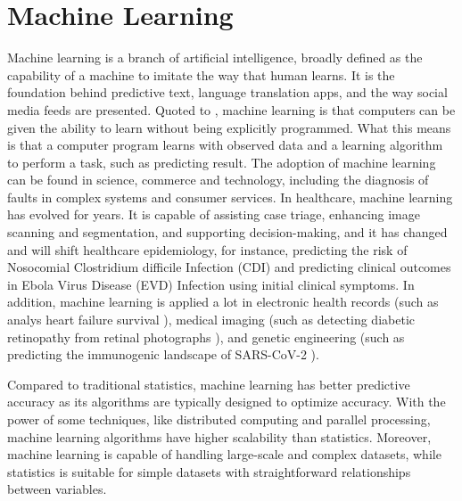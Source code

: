 \documentclass[12pt,a4paper,english
]{tunithesis}
\begin{document}
\section{Machine Learning}
Machine learning is a branch of artificial intelligence, broadly defined as the capability of a machine to imitate the way that human learns. It is the foundation behind predictive text, language translation apps, and the way social media feeds are presented. \parencite{sara2021} Quoted to \textcite{samuel1959}, machine learning is that computers can be given the ability to learn without being explicitly programmed. What this means is that a computer program learns with observed data and a learning algorithm to perform a task, such as predicting result. %
The adoption of machine learning can be found in science, commerce and technology, including the diagnosis of faults in complex systems and consumer services. \parencite{jorden2015} In healthcare, machine learning has evolved for years. It is capable of assisting case triage, enhancing image scanning and segmentation, and supporting decision-making, and it has changed and will shift healthcare epidemiology, for instance, predicting the risk of Nosocomial Clostridium difficile Infection (CDI) and predicting clinical outcomes in Ebola Virus Disease (EVD) Infection using initial clinical symptoms. \parencite{Jenna2017, Habehh2021} In addition, machine learning is applied a lot in electronic health records (such as analys heart failure survival \parencite{Panahiazar2015}), medical imaging (such as detecting diabetic retinopathy from retinal photographs \parencite{Gulshan2016}), and genetic engineering (such as predicting the immunogenic landscape of SARS-CoV-2 \parencite{Malone2020} ).

Compared to traditional statistics, machine learning has better predictive accuracy as its algorithms are typically designed to optimize accuracy. With the power of some techniques, like distributed computing and parallel processing, machine learning algorithms have higher scalability than statistics. Moreover, machine learning is capable of handling large-scale and complex datasets, while statistics is suitable for simple datasets with straightforward relationships between variables.  \parencite{Bzdok2018, Rajula2020}
\end{document}
